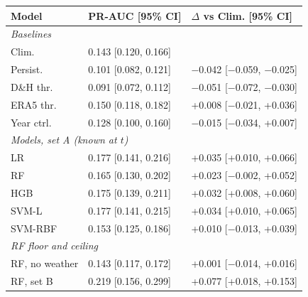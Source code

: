 \begin{tabular}{lll}
\toprule
Model & PR-AUC [95\% CI] & $\Delta$ vs Clim. [95\% CI] \\
\midrule
\multicolumn{3}{l}{\textit{Baselines}} \\
Clim. & 0.143 [0.120, 0.166] &  \\
Persist. & 0.101 [0.082, 0.121] & $-$0.042 [$-$0.059, $-$0.025] \\
D\&H thr. & 0.091 [0.072, 0.112] & $-$0.051 [$-$0.072, $-$0.030] \\
ERA5 thr. & 0.150 [0.118, 0.182] & +0.008 [$-$0.021, +0.036] \\
Year ctrl. & 0.128 [0.100, 0.160] & $-$0.015 [$-$0.034, +0.007] \\
\midrule\multicolumn{3}{l}{\textit{Models, set A (known at $t$)}} \\
LR & 0.177 [0.141, 0.216] & +0.035 [+0.010, +0.066] \\
RF & 0.165 [0.130, 0.202] & +0.023 [$-$0.002, +0.052] \\
HGB & 0.175 [0.139, 0.211] & +0.032 [+0.008, +0.060] \\
SVM-L & 0.177 [0.141, 0.215] & +0.034 [+0.010, +0.065] \\
SVM-RBF & 0.153 [0.125, 0.186] & +0.010 [$-$0.013, +0.039] \\
\midrule\multicolumn{3}{l}{\textit{RF floor and ceiling}} \\
RF, no weather & 0.143 [0.117, 0.172] & +0.001 [$-$0.014, +0.016] \\
RF, set B & 0.219 [0.156, 0.299] & +0.077 [+0.018, +0.153] \\
\bottomrule
\end{tabular}
